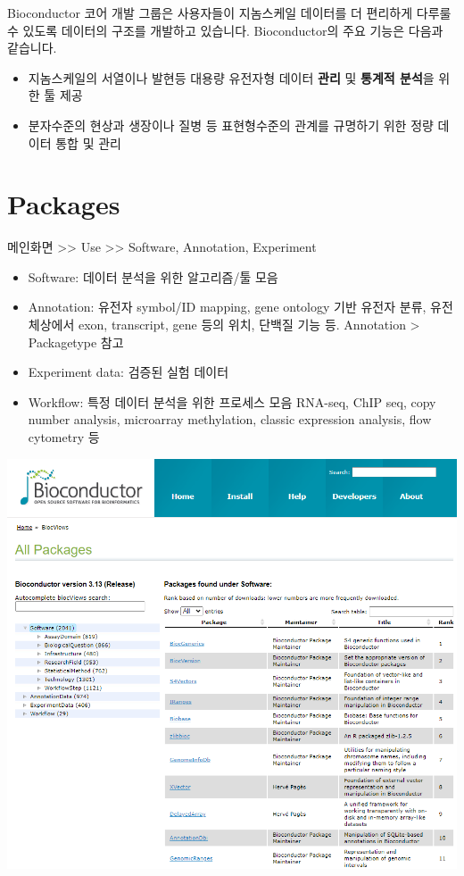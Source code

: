 \documentclass[
  a4paper,
]{book}
\providecommand{\tightlist}{%
  \setlength{\itemsep}{0pt}\setlength{\parskip}{0pt}}\usepackage{longtable,booktabs,array}
\begin{document}
Bioconductor 코어 개발 그룹은 사용자들이 지놈스케일 데이터를 더 편리하게
다루룰 수 있도록 데이터의 구조를 개발하고 있습니다. Bioconductor의 주요
기능은 다음과 같습니다.

\begin{itemize}
\tightlist
\item
  지놈스케일의 서열이나 발현등 대용량 유전자형 데이터 \textbf{관리} 및
  \textbf{통계적 분석}을 위한 툴 제공
\item
  분자수준의 현상과 생장이나 질병 등 표현형수준의 관계를 규명하기 위한
  정량 데이터 통합 및 관리
\end{itemize}

\hypertarget{packages}{%
\section{Packages}\label{packages}}

메인화면 \textgreater\textgreater{} Use \textgreater\textgreater{}
Software, Annotation, Experiment

\begin{itemize}
\tightlist
\item
  Software: 데이터 분석을 위한 알고리즘/툴 모음
\item
  Annotation: 유전자 symbol/ID mapping, gene ontology 기반 유전자 분류,
  유전체상에서 exon, transcript, gene 등의 위치, 단백질 기능 등.
  Annotation \textgreater{} Packagetype 참고
\item
  Experiment data: 검증된 실험 데이터
\item
  Workflow: 특정 데이터 분석을 위한 프로세스 모음 RNA-seq, ChIP seq,
  copy number analysis, microarray methylation, classic expression
  analysis, flow cytometry 등
\end{itemize}

\includegraphics[width=6.25in,height=\textheight]{images/bioconductor_list.PNG}
\end{document}
